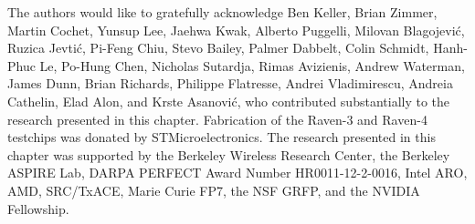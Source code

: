 \documentclass[graybox]{svmult}
\begin{document}
\begin{acknowledgement}
The authors would like to gratefully acknowledge Ben Keller, Brian Zimmer, Martin Cochet, Yunsup Lee, Jaehwa Kwak, Alberto Puggelli, Milovan Blagojevi\'{c}, Ruzica Jevti\'{c}, Pi-Feng Chiu, Stevo Bailey, Palmer Dabbelt, Colin Schmidt, Hanh-Phuc Le, Po-Hung Chen, Nicholas Sutardja, Rimas Avizienis, Andrew Waterman, James Dunn, Brian Richards, Philippe Flatresse, Andrei Vladimirescu, Andreia Cathelin, Elad Alon, and Krste Asanovi\'{c}, who contributed substantially to the research presented in this chapter.
Fabrication of the Raven-3 and Raven-4 testchips was donated by STMicroelectronics.
The research presented in this chapter was supported by the Berkeley Wireless Research Center, the Berkeley ASPIRE Lab, DARPA PERFECT Award Number HR0011-12-2-0016, Intel ARO, AMD, SRC/TxACE, Marie Curie FP7, the NSF GRFP, and the NVIDIA Fellowship.
\end{acknowledgement}



\printbibliography
\end{document}
